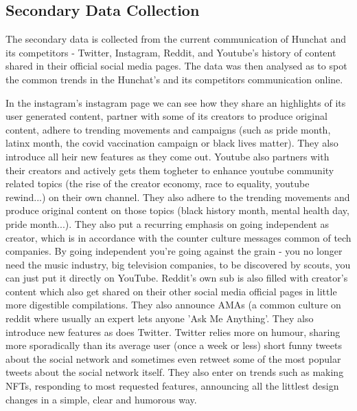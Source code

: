\documentclass[12pt]{article}
\begin{document}
\subsection{Secondary Data Collection}
The secondary data is collected from the current communication of Hunchat and its competitors  - Twitter, Instagram, Reddit, and Youtube's history of content shared in their official social media pages. The data was then analysed as to spot the common trends in the Hunchat's and its competitors communication online. 

In the instagram's instagram page we can see how they share an highlights of its user generated content, partner with some of its creators to produce original content, adhere to trending movements and campaigns (such as pride month, latinx month, the covid vaccination campaign or black lives matter). They also introduce all heir new features as they come out. Youtube also partners with their creators and actively gets them togheter to enhance youtube community related topics (the rise of the creator economy, race to equality, youtube rewind...) on their own channel. They also adhere to the trending movements and produce original content on those topics (black history month, mental health day, pride month...). They also put a recurring emphasis on going independent as creator, which is in accordance with the counter culture messages common of tech companies. By going independent you're going against the grain - you no longer need the music industry, big television companies, to be discovered by scouts, you can just put it directly on YouTube. Reddit's own sub is also filled with creator's content which also get shared on their other social media official pages in little more digestible compilations. They also announce AMAs (a common culture on reddit where usually an expert lets anyone 'Ask Me Anything'. They also introduce new features as does Twitter. Twitter relies more on humour, sharing more sporadically than its average user (once a week or less) short funny tweets about the social network  and sometimes even retweet some of the most popular tweets about the social network itself. They also enter on trends such as making NFTs, responding to most requested features, announcing all the littlest design changes in a simple, clear and humorous way.
\end{document}
